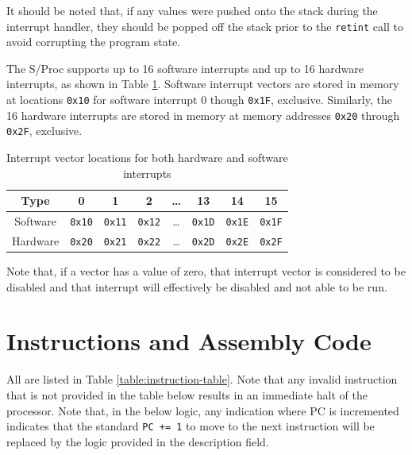 \documentclass{article}
\begin{document}
It should be noted that, if any values were pushed onto the stack during the interrupt handler, they should be popped off the stack prior to the \texttt{retint} call to avoid corrupting the program state.

The S/Proc supports up to 16 software interrupts and up to 16 hardware interrupts, as shown in Table \ref{table:interrupt-vector-locations}. \alert{Software interrupt vectors are stored in memory at locations} \texttt{0x10} for software interrupt 0 though \texttt{0x1F}, exclusive. Similarly, the \alert{16 hardware interrupts are stored in memory at memory addresses} \texttt{0x20} through \texttt{0x2F}, exclusive.

\begin{table}[h!]
    \centering
    \begin{tabular}{c|ccccccc}
        \hline
        Type & 0 & 1 & 2 & \dots & 13 & 14 & 15 \\
        \hline
        Software & \texttt{0x10} & \texttt{0x11} & \texttt{0x12} & \dots & \texttt{0x1D} & \texttt{0x1E} & \texttt{0x1F} \\
        Hardware & \texttt{0x20} & \texttt{0x21} & \texttt{0x22} & \dots & \texttt{0x2D} & \texttt{0x2E} & \texttt{0x2F} \\
        \hline
    \end{tabular}
    \caption{Interrupt vector locations for both hardware and software interrupts}
    \label{table:interrupt-vector-locations}
\end{table}

Note that, if a vector has a value of zero, that interrupt vector is considered to be disabled and that interrupt will effectively be disabled and not able to be run.

\pagebreak

\section{Instructions and Assembly Code}
\label{sec:instructions}

All  are listed in Table \ref{table:instruction-table}. Note that any invalid instruction that is not provided in the table below results in an immediate halt of the processor. Note that, in the below logic, any indication where PC is incremented indicates that the standard \texttt{PC += 1} to move to the next instruction will be replaced by the logic provided in the description field.
\end{document}
